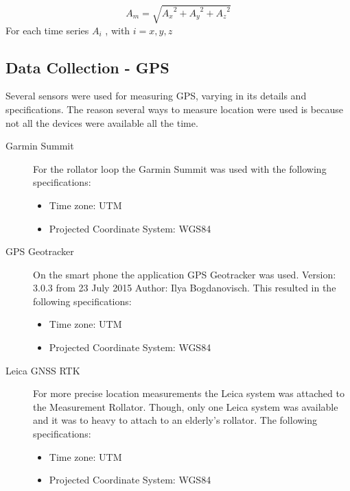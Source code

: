 \begin{equation}
A_{m} = \sqrt {{A_{x}}^{2} + {A_{y}}^{2} + {A_{z}}^ {2}}
\end{equation} For each time series $A_{i}$ , with $i = {x, y, z}$ 



\subsection{Data Collection - GPS }
Several sensors were used for measuring GPS, varying in its details and specifications. The reason several ways to measure location were used is because not all the devices were available all the time. 

\begin{description} 
\item[Garmin Summit]
For the rollator loop the Garmin Summit was used with the following specifications:
\begin{itemize}
\item Time zone: UTM
\item Projected Coordinate System: WGS84
\end{itemize}
\end{description}

\begin{description}
\item[GPS Geotracker ]
On the smart phone the application GPS Geotracker was used. Version: 3.0.3 from 23 July 2015 Author: Ilya Bogdanovisch. This resulted in the following specifications:
\begin{itemize}
\item Time zone: UTM
\item Projected Coordinate System: WGS84
\end{itemize}
\end{description}

\begin{description}
\item[Leica GNSS RTK]
For more precise location measurements the Leica system was attached to the Measurement Rollator. Though, only one Leica system was available and it was to heavy to attach to an elderly's rollator. The following specifications:
\begin{itemize}
\item Time zone: UTM
\item Projected Coordinate System: WGS84
\end{itemize}
\end{description}

